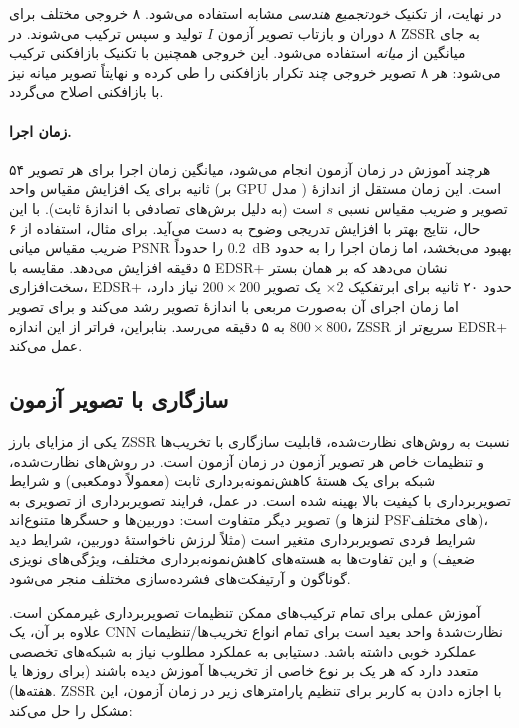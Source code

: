 در نهایت، از تکنیک \emph{خودتجمیع هندسی}
 مشابه \cite{lim2017edsr}
استفاده می‌شود. ۸ خروجی مختلف برای ۸ دوران و بازتاب تصویر آزمون $I$
تولید و سپس ترکیب می‌شوند. در ZSSR به جای میانگین از \emph{میانه}
استفاده می‌شود. این خروجی همچنین با تکنیک بازافکنی
 \cite{irani1991backproj, glasner2009sr}
ترکیب می‌شود: هر ۸ تصویر خروجی چند تکرار بازافکنی را طی کرده
و نهایتاً تصویر میانه نیز با بازافکنی اصلاح می‌گردد.

\paragraph{زمان اجرا.}
هرچند آموزش در زمان آزمون انجام می‌شود، میانگین زمان اجرا برای هر
تصویر ۵۴ ثانیه برای یک افزایش مقیاس واحد (بر GPU مدل )
است. این زمان مستقل از اندازهٔ تصویر و ضریب مقیاس نسبی $s$ است (به
دلیل برش‌های تصادفی با اندازهٔ ثابت). با این حال، نتایج بهتر با
افزایش تدریجی وضوح به دست می‌آید. برای مثال، استفاده از ۶ ضریب مقیاس
میانی PSNR را حدوداً $0.2$~dB بهبود می‌بخشد، اما زمان اجرا را به حدود
۵ دقیقه افزایش می‌دهد. مقایسه با EDSR+ \cite{lim2017edsr} نشان
می‌دهد که بر همان بستر سخت‌افزاری، EDSR+ حدود ۲۰ ثانیه برای ابرتفکیک
$\times 2$ یک تصویر $200 \times 200$ نیاز دارد، اما زمان اجرای آن
به‌صورت مربعی با اندازهٔ تصویر رشد می‌کند و برای تصویر $800 \times 800$
به ۵ دقیقه می‌رسد. بنابراین، فراتر از این اندازه، ZSSR سریع‌تر از
EDSR+ عمل می‌کند.

\subsection{سازگاری با تصویر آزمون}
\label{subsec:adaptation}

یکی از مزایای بارز ZSSR نسبت به روش‌های نظارت‌شده، قابلیت سازگاری
با تخریب‌ها و تنظیمات خاص هر تصویر آزمون در زمان آزمون است. در
روش‌های نظارت‌شده، شبکه برای یک هستهٔ کاهش‌نمونه‌برداری ثابت (معمولاً
دومکعبی) و شرایط تصویربرداری با کیفیت بالا بهینه شده است. در عمل،
فرایند تصویربرداری از تصویری به تصویر دیگر متفاوت است: دوربین‌ها و
حسگرها متنوع‌اند (لنزها و PSFهای مختلف)، شرایط فردی تصویربرداری
متغیر است (مثلاً لرزش ناخواستهٔ دوربین، شرایط دید ضعیف) و
این تفاوت‌ها به هسته‌های کاهش‌نمونه‌برداری مختلف، ویژگی‌های نویزی
گوناگون و آرتیفکت‌های فشرده‌سازی مختلف منجر می‌شود.

آموزش عملی برای تمام ترکیب‌های ممکن تنظیمات تصویربرداری غیرممکن
است. علاوه بر آن، یک CNN نظارت‌شدهٔ واحد بعید است برای تمام انواع
تخریب‌ها/تنظیمات عملکرد خوبی داشته باشد. دستیابی به عملکرد مطلوب
نیاز به شبکه‌های تخصصی متعدد دارد که هر یک بر نوع خاصی از تخریب‌ها
آموزش دیده باشند (برای روزها یا هفته‌ها). ZSSR با اجازه دادن به
کاربر برای تنظیم پارامترهای زیر در زمان آزمون، این مشکل را حل
می‌کند:

